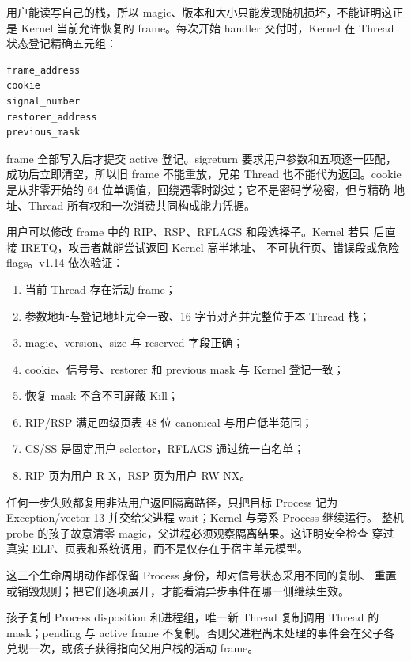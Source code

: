 用户能读写自己的栈，所以 magic、版本和大小只能发现随机损坏，不能证明这正是
Kernel 当前允许恢复的 frame。每次开始 handler 交付时，Kernel 在 Thread
状态登记精确五元组：

\begin{lstlisting}
frame_address
cookie
signal_number
restorer_address
previous_mask
\end{lstlisting}

frame 全部写入后才提交 active 登记。sigreturn 要求用户参数和五项逐一匹配，
成功后立即清空，所以旧 frame 不能重放，兄弟 Thread 也不能代为返回。cookie
是从非零开始的 64 位单调值，回绕遇零时跳过；它不是密码学秘密，但与精确
地址、Thread 所有权和一次消费共同构成能力凭据。

用户可以修改 frame 中的 RIP、RSP、RFLAGS 和段选择子。Kernel 若只
 后直接 IRETQ，攻击者就能尝试返回 Kernel 高半地址、
不可执行页、错误段或危险 flags。v1.14 依次验证：

\begin{enumerate}
  \item 当前 Thread 存在活动 frame；
  \item 参数地址与登记地址完全一致、16 字节对齐并完整位于本 Thread 栈；
  \item magic、version、size 与 reserved 字段正确；
  \item cookie、信号号、restorer 和 previous mask 与 Kernel 登记一致；
  \item 恢复 mask 不含不可屏蔽 Kill；
  \item RIP/RSP 满足四级页表 48 位 canonical 与用户低半范围；
  \item CS/SS 是固定用户 selector，RFLAGS 通过统一白名单；
  \item RIP 页为用户 R-X，RSP 页为用户 RW-NX。
\end{enumerate}

任何一步失败都复用非法用户返回隔离路径，只把目标 Process 记为
Exception/vector 13 并交给父进程 wait；Kernel 与旁系 Process 继续运行。
整机 probe 的孩子故意清零 magic，父进程必须观察隔离结果。这证明安全检查
穿过真实 ELF、页表和系统调用，而不是仅存在于宿主单元模型。

这三个生命周期动作都保留 Process 身份，却对信号状态采用不同的复制、
重置或销毁规则；把它们逐项展开，才能看清异步事件在哪一侧继续生效。

孩子复制 Process disposition 和进程组，唯一新 Thread 复制调用 Thread 的
mask；pending 与 active frame 不复制。否则父进程尚未处理的事件会在父子各
兑现一次，或孩子获得指向父用户栈的活动 frame。

